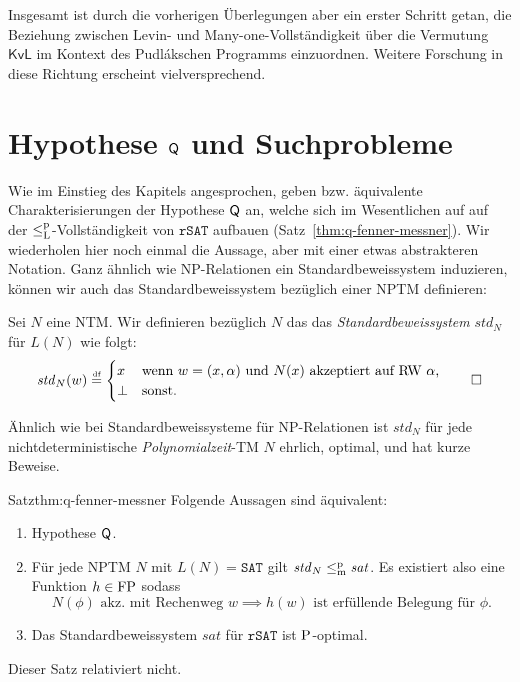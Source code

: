 
Insgesamt ist durch die vorherigen Überlegungen aber ein erster Schritt getan, die Beziehung zwischen Levin- und Many-one-Vollständigkeit über die Vermutung $\mathsf{KvL}$ im Kontext des Pudlákschen Programms einzuordnen.
Weitere Forschung in diese Richtung erscheint vielversprechend.

\section{Hypothese $\hQ$ und Suchprobleme}\label{sec:q-vs-search}

Wie im Einstieg des Kapitels angesprochen, geben \textcite{fenner_inverting_2003} bzw. \textcite{messner_simulation_2001} äquivalente Charakterisierungen der Hypothese $\hQ$ an, welche sich im Wesentlichen auf auf der $\leqlp$-Vollständigkeit von $\mathtt{rSAT}$ aufbauen (Satz~\ref{thm:q-fenner-messner}).
Wir wiederholen hier noch einmal die Aussage, aber mit einer etwas abstrakteren Notation.
Ganz ähnlich wie NP-Relationen ein Standardbeweissystem induzieren, können wir auch das Standardbeweissystem bezüglich einer NPTM definieren:
\begin{definition}
    Sei $N$ eine NTM. Wir definieren bezüglich $N$ das das \emph{Standardbeweissystem} $\mathit{std}_N$ für $L(N)$ wie folgt:
    \[ \mathit{std}_N(w) \defeq \begin{cases} x & \text{wenn $w=(x,\alpha)$ und $N(x)$ akzeptiert auf RW $\alpha$,}\\
    \bot & \text{sonst}.\end{cases} \qedhere \] 
\end{definition}
Ähnlich wie bei Standardbeweissysteme für NP-Relationen ist $\mathit{std}_N$ für jede nichtdeterministische \emph{Polynomialzeit}-TM $N$ ehrlich, optimal, und hat kurze Beweise.
\begin{reptheorem}{Satz}{thm:q-fenner-messner}
    Folgende Aussagen sind äquivalent:
    \begin{enumerate}
        \item Hypothese $\hQ$.
        \item Für jede NPTM $N$ mit $L(N)=\mathtt{SAT}$ gilt $\mathit{std}_N\leqmp \mathit{sat}$. Es existiert also eine Funktion $h\in \FP$ sodass 
            \[ N(\phi) \text{ akz. mit Rechenweg $w$} \implies \text{$h(w)$ ist erfüllende Belegung für $\phi$}. \]
        \item Das Standardbeweissystem $\mathit{sat}$ für $\mathtt{rSAT}$ ist $\P$-optimal.
    \end{enumerate}
    Dieser Satz relativiert nicht.
\end{reptheorem}

